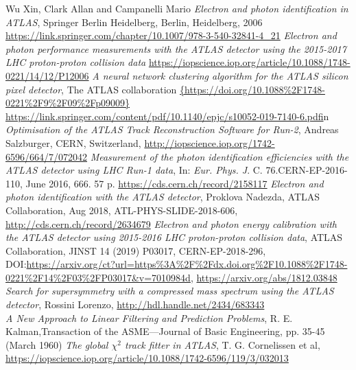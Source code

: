 \documentclass[a4paper, oneside, 11pt, openright]{book}
\begin{document}
\begin{thebibliography}{32}
			 Wu Xin, Clark Allan and Campanelli Mario \textit{Electron and photon identification in ATLAS}, Springer Berlin Heidelberg, Berlin, Heidelberg, 2006
			\url{https://link.springer.com/chapter/10.1007/978-3-540-32841-4_21} 
			\textit{Electron and photon performance measurements with the {ATLAS} detector using the 2015-2017 {LHC} proton-proton collision data}
			\url{https://iopscience.iop.org/article/10.1088/1748-0221/14/12/P12006}
			 \textit{A neural network clustering algorithm for the ATLAS silicon pixel detector}, The ATLAS collaboration
			\url{{https://doi.org/10.1088%2F1748-0221%2F9%2F09%2Fp09009}}
			\url{https://link.springer.com/content/pdf/10.1140/epjc/s10052-019-7140-6.pdf}in
			 \textit{Optimisation of the ATLAS Track Reconstruction Software for Run-2}, Andreas Salzburger, CERN, Switzerland, \url{http://iopscience.iop.org/1742-6596/664/7/072042}
			\textit{Measurement of the photon identification efficiencies with the ATLAS detector using LHC Run-1 data}, In: \textit{Eur. Phys. J}. C. 76.CERN-EP-2016-110, June 2016, 666. 57 p. 
			\url{https://cds.cern.ch/record/2158117} 
			 \textit{Electron and photon identification with the ATLAS detector}, Proklova Nadezda, ATLAS Collaboration, Aug 2018, ATL-PHYS-SLIDE-2018-606, \url{http://cds.cern.ch/record/2634679}
			\textit{Electron and photon energy calibration with the ATLAS detector using 2015-2016 LHC proton-proton collision data}, ATLAS Collaboration, JINST 14 (2019) P03017, CERN-EP-2018-296,  DOI:\url{https://arxiv.org/ct?url=https%3A%2F%2Fdx.doi.org%2F10.1088%2F1748-0221%2F14%2F03%2FP03017&v=7010984d}, 
			\url{https://arxiv.org/abs/1812.03848}
			 \textit{Search for supersymmetry with a compressed mass spectrum using the ATLAS detector}, Rossini Lorenzo, \url{http://hdl.handle.net/2434/683343 }\\
			 \textit{A New Approach to Linear Filtering and Prediction Problems}, R. E. Kalman,Transaction of the ASME—Journal of Basic Engineering,
			pp. 35-45 (March 1960)
			\textit{The global $\chi^2$ track fitter in ATLAS}, T. G. Cornelissen et al, \url{https://iopscience.iop.org/article/10.1088/1742-6596/119/3/032013}

\end{thebibliography}
\end{document}
